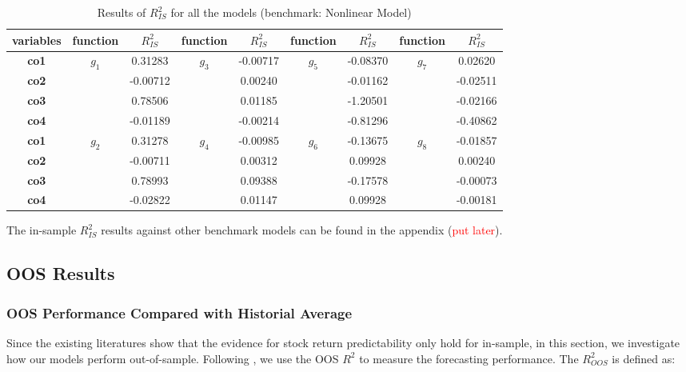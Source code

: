 \documentclass[a4paper,12pt,times,numbered,print,index]{report}
\numberwithin{equation}{section}
\begin{document}
\begin{table}[!htbp]
	\centering
	\caption{Results of $R^2_{IS}$ for all the models (benchmark: Nonlinear Model)}
	\begin{adjustbox}{max width=\textwidth}
		\begin{tabular}{ccccccccc}
			\toprule
			\textbf{variables} & \textbf{function} & \textbf{$R^2_{IS}$} & \textbf{function} & \textbf{$R^2_{IS}$} & \textbf{function} & \textbf{$R^2_{IS}$} & \textbf{function} & \textbf{$R^2_{IS}$} \\
			\midrule
		\textbf{co1} & \multirow{4}[2]{*}{$g_1$} & 0.31283 & \multirow{4}[2]{*}{$g_3$} & -0.00717 & \multirow{4}[2]{*}{$g_5$} & -0.08370 & \multirow{4}[2]{*}{$g_7$} & 0.02620 \\
		\textbf{co2} &       & -0.00712 &       & 0.00240 &       & -0.01162 &       & -0.02511 \\
		\textbf{co3} &       & 0.78506 &       & 0.01185 &       & -1.20501 &       & -0.02166 \\
		\textbf{co4} &       & -0.01189 &       & -0.00214 &       & -0.81296 &       & -0.40862 \\
		\midrule
		\textbf{co1} & \multirow{4}[2]{*}{$g_2$} & 0.31278 & \multirow{4}[2]{*}{$g_4$} & -0.00985 & \multirow{4}[2]{*}{$g_6$} & -0.13675 & \multirow{4}[2]{*}{$g_8$} & -0.01857 \\
		\textbf{co2} &       & -0.00711 &       & 0.00312 &       & 0.09928 &       & 0.00240 \\
		\textbf{co3} &       & 0.78993 &       & 0.09388 &       & -0.17578 &       & -0.00073 \\
		\textbf{co4} &       & -0.02822 &       & 0.01147 &       & 0.09928 &       & -0.00181 \\
		\bottomrule
		\bottomrule
	\end{tabular}%
	\end{adjustbox}
	\label{ins_R2_NLS}%
\end{table}%

The in-sample $R^2_{IS}$ results against other benchmark models can be found in the appendix (\textcolor{red}{put later}). 

\subsection{OOS Results}

\subsubsection{OOS Performance Compared with Historial Average}
Since the existing literatures show that the evidence for stock return predictability only hold for in-sample, in this section, we investigate how our models perform out-of-sample. Following \cite{campbell2008predicting}, we use the OOS $R^2$ to measure the forecasting performance. The $R^2_{OOS}$ is defined as:
\end{document}
